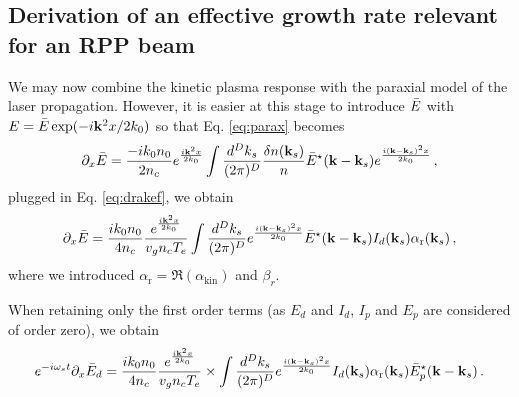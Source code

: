 \documentclass[
 reprint,
 amsmath,amssymb,
 aps,
]{revtex4-1}
\begin{document}
\subsection{Derivation of an effective growth rate relevant for an  RPP beam}
 \begin{widetext}
We may now combine the kinetic plasma response  with the paraxial model of  the laser propagation. 
However, it  is easier at this stage to introduce $\Bar{E}$ with  $E=\Bar{E}\exp(-i \mathbf{k}^2x /2k_0)$ so that Eq. \eqref{eq:parax} becomes
\begin{equation}
    \partial_x \Bar{E}  =\frac{-ik_0n_0}{2n_c} e^{\frac{i\mathbf{k}^2x }{2k_0}}\int \frac{d^Dk_s}{(2\pi)^D} \frac{\delta n(\mathbf{k}_s)}{n} \Bar{E}^\star(\mathbf{k}-\mathbf{k}_s) e^{ \frac{i(\mathbf{k}-\mathbf{k}_s)^2x}{2k_0}}\, ,  \label{eq:paraxbar}
\end{equation}
 plugged in Eq. \eqref{eq:drakef}, we obtain
\begin{align}
    \partial_x \Bar{E}  =\frac{ik_0n_0}{4n_c} \frac{e^{\frac{i\mathbf{k}^2 x}{2k_0}}}{  v_g n_c T_e}
    \int \frac{d^Dk_s}{(2\pi)^D}  e^{ \frac{i(\mathbf{k}-\mathbf{k}_s)^2x}{2k_0}} \Bar{E}^\star(\mathbf{k}-\mathbf{k}_s) 
   I_d(\mathbf{k}_s) \alpha_\mathrm{r}   (\mathbf{k}_s) \, ,  \label{eq:paraxbar}
\end{align}
where we introduced $\alpha_\mathrm{r}=\Re(\alpha_\mathrm{kin} )$ and $\beta_r$. 

 When retaining only the first order terms (as $E_d$ and $I_d$, $I_p$ and $E_p$ are considered of order zero), we obtain 
 \begin{align}
   e^{-i\omega_s t}\partial_x \Bar{E}_d  =\frac{ik_0n_0}{4n_c} \frac{e^{\frac{i\mathbf{k}^2 x}{2k_0}}}{  v_g n_c T_e} \times 
   \int \frac{d^Dk_s}{(2\pi)^D} 
   e^{ \frac{i(\mathbf{k}-\mathbf{k}_s)^2x}{2k_0}}
   I_d(\mathbf{k}_s) \alpha_\mathrm{r}   (\mathbf{k}_s) \Bar{E}_p^\star(\mathbf{k}-\mathbf{k}_s) 
   \, .  \label{eq:paraxbar}
\end{align}


\end{widetext}
\end{document}
